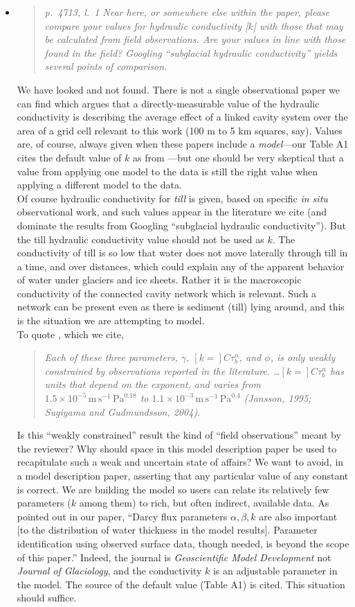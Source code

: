 \documentclass[11pt,reqno]{amsart}
\newcommand{\reply}[2]{
\medskip\medskip
\item  \begin{quote}
\emph{#1}
\end{quote}

\medskip
\noindent #2}
\begin{document}
\begin{itemize}
\reply{p.~4713, l.~1 Near here, or somewhere else within the paper, please compare your
values for hydraulic conductivity [$k$] with those that may be calculated from field observations. Are your values in line with those found in the field? Googling ``subglacial
hydraulic conductivity'' yields several points of comparison.}
{We have looked and not found.  There is not a single observational paper we can find which argues that a directly-measurable value of the hydraulic conductivity is describing the average effect of a linked cavity system over the area of a grid cell relevant to this work (100 m to 5 km squares, say).  Values are, of course, always given when these papers include a \emph{model}---our Table A1 cites the default value of $k$ as from \cite{Schoofetal2012}---but one should be very skeptical that a value from applying one model to the data is still the right value when applying a different model to the data. \\
\indent Of course hydraulic conductivity for \emph{till} is given, based on specific \emph{in situ} observational work, and such values appear in the literature we cite (and dominate the results from Googling ``subglacial hydraulic conductivity'').  But the till hydraulic conductivity value should not be used as $k$.  The conductivity of till is so low that water does not move laterally through till in a time, and over distances, which could explain any of the apparent behavior of water under glaciers and ice sheets.  Rather it is the macroscopic conductivity of the connected cavity network which is relevant.  Such a network can be present even as there is sediment (till) lying around, and this is the situation we are attempting to model. \\
\indent  To quote \cite{Bartholomausetal2011}, which we cite, \begin{quote}
\emph{Each of these three parameters, $\gamma$, $[k=]C\tau_b^n$, and $\phi$, is only weakly constrained by observations reported in the literature.  \dots $[k=]C\tau_b^n$ has units that depend on the exponent, and varies from $1.5\times 10^{-5}\, \text{m}\,\text{s}^{-1}\,\text{Pa}^{0.18}$ to $1.1\times 10^{-3}\, \text{m}\,\text{s}^{-1}\,\text{Pa}^{0.4}$ (Jansson, 1995; Sugiyama and Gudmundsson, 2004).}
\end{quote}
Is this ``weakly constrained'' result the kind of ``field observations'' meant by the reviewer?  Why should space in this model description paper be used to recapitulate such a weak and uncertain state of affairs?  We want to avoid, in a model description paper, asserting that any particular value of any constant is correct.  We are building the model so users can relate its relatively few parameters ($k$ among them) to rich, but often indirect, available data.  As pointed out in our paper, ``Darcy flux parameters $\alpha,\beta,k$ are also important [to the distribution of water thickness in the model results].  Parameter identification using observed surface data, though needed, is beyond the scope of this paper.''  Indeed, the journal is \emph{Geoscientific Model Development} not \emph{Journal of Glaciology}, and the conductivity $k$ is an adjustable parameter in the model.  The source of the default value (Table A1) is cited.  This situation should suffice.}


\end{itemize}
\end{document}
